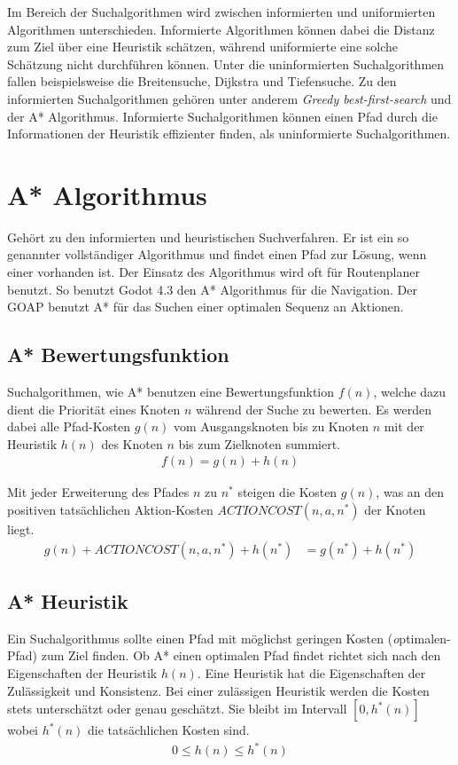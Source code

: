 Im Bereich der Suchalgorithmen wird zwischen informierten und uniformierten Algorithmen unterschieden. Informierte Algorithmen können dabei die Distanz zum Ziel über eine Heuristik schätzen, während uniformierte eine solche Schätzung nicht durchführen können. Unter die uninformierten Suchalgorithmen fallen beispielsweise die Breitensuche, Dijkstra und Tiefensuche. Zu den informierten Suchalgorithmen gehören unter anderem \textit{Greedy best-first-search} und der A* Algorithmus. Informierte Suchalgorithmen können einen Pfad durch die Informationen der Heuristik effizienter finden, als uninformierte Suchalgorithmen.

\section{A* Algorithmus}

Gehört zu den informierten und heuristischen Suchverfahren. Er ist ein so genannter vollständiger Algorithmus und findet einen Pfad zur Lösung, wenn einer vorhanden ist. Der Einsatz des Algorithmus wird oft für Routenplaner benutzt. So benutzt Godot 4.3 den A* Algorithmus für die Navigation. Der GOAP benutzt A* für das Suchen einer optimalen Sequenz an Aktionen.

\subsection{A* Bewertungsfunktion}
Suchalgorithmen, wie A* benutzen eine Bewertungsfunktion $f(n)$, welche dazu dient die Priorität eines Knoten $n$ während der Suche zu bewerten. Es werden dabei alle Pfad-Kosten $g(n)$ vom Ausgangsknoten bis zu Knoten $n$ mit der Heuristik $h(n)$ des Knoten $n$ bis zum Zielknoten summiert.
\begin{align*}
f(n) = g(n) + h(n)
\end{align*}

Mit jeder Erweiterung des Pfades $n$ zu $n^{\ast}$ steigen die Kosten $g(n)$, was an den positiven tatsächlichen Aktion-Kosten $ACTIONCOST(n,a,n^*)$ der Knoten liegt.
\begin{align*}
g(n) + ACTIONCOST(n,a,n^*) + h(n^*) &= g(n^*) + h(n^*)
\end{align*}

\subsection{A* Heuristik}
Ein Suchalgorithmus sollte einen Pfad mit möglichst geringen Kosten (\textit optimalen-Pfad) zum Ziel finden. Ob A* einen optimalen Pfad findet richtet sich nach den Eigenschaften der Heuristik $h(n)$. Eine Heuristik hat die Eigenschaften der Zulässigkeit und Konsistenz.
Bei einer zulässigen Heuristik werden die Kosten stets unterschätzt oder genau geschätzt. Sie bleibt im Intervall $[0, h^{\ast}(n)]$ wobei $h^{\ast}(n)$ die tatsächlichen Kosten sind.
\begin{align*}
0 \leq h(n) \leq h^*(n)
\end{align*}

